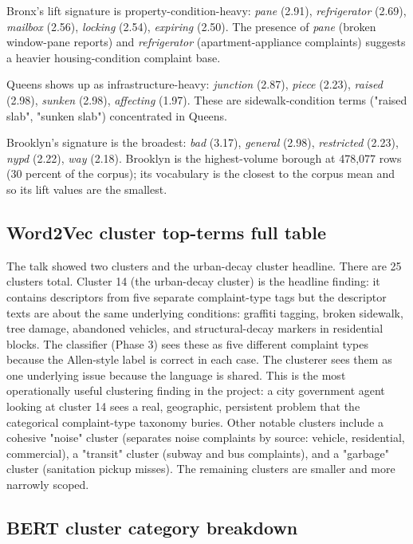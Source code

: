 \documentclass[11pt,letterpaper]{article}
\begin{document}
Bronx's lift signature is property-condition-heavy: \textit{pane} (2.91), \textit{refrigerator} (2.69), \textit{mailbox} (2.56), \textit{locking} (2.54), \textit{expiring} (2.50). The presence of \textit{pane} (broken window-pane reports) and \textit{refrigerator} (apartment-appliance complaints) suggests a heavier housing-condition complaint base.

Queens shows up as infrastructure-heavy: \textit{junction} (2.87), \textit{piece} (2.23), \textit{raised} (2.98), \textit{sunken} (2.98), \textit{affecting} (1.97). These are sidewalk-condition terms ("raised slab", "sunken slab") concentrated in Queens.

Brooklyn's signature is the broadest: \textit{bad} (3.17), \textit{general} (2.98), \textit{restricted} (2.23), \textit{nypd} (2.22), \textit{way} (2.18). Brooklyn is the highest-volume borough at 478,077 rows (30 percent of the corpus); its vocabulary is the closest to the corpus mean and so its lift values are the smallest.

\subsection{Word2Vec cluster top-terms full table}

The talk showed two clusters and the urban-decay cluster headline. There are 25 clusters total. Cluster 14 (the urban-decay cluster) is the headline finding: it contains descriptors from five separate complaint-type tags but the descriptor texts are about the same underlying conditions: graffiti tagging, broken sidewalk, tree damage, abandoned vehicles, and structural-decay markers in residential blocks. The classifier (Phase 3) sees these as five different complaint types because the Allen-style label is correct in each case. The clusterer sees them as one underlying issue because the language is shared. This is the most operationally useful clustering finding in the project: a city government agent looking at cluster 14 sees a real, geographic, persistent problem that the categorical complaint-type taxonomy buries. Other notable clusters include a cohesive "noise" cluster (separates noise complaints by source: vehicle, residential, commercial), a "transit" cluster (subway and bus complaints), and a "garbage" cluster (sanitation pickup misses). The remaining clusters are smaller and more narrowly scoped.

\subsection{BERT cluster category breakdown}
\end{document}
